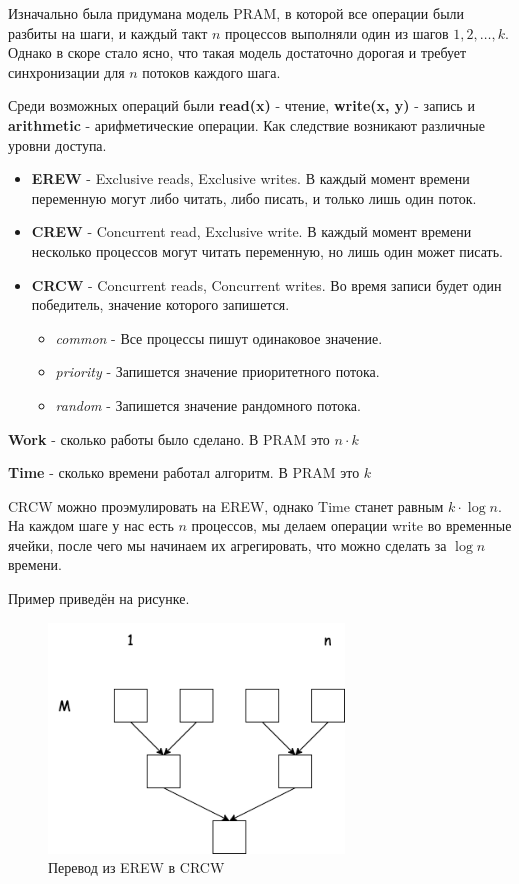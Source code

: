 \documentclass[11pt]{article}
\begin{document}
    Изначально была придумана модель PRAM, в которой все операции были разбиты на шаги,
    и каждый такт $n$ процессов выполняли один из шагов $1, 2, \dots, k$.
    Однако в скоре стало ясно, что такая модель достаточно дорогая и требует синхронизации для $n$ потоков каждого шага.

    Среди возможных операций были \textbf{read(x)} - чтение, \textbf{write(x, y)} - запись и \textbf{arithmetic} - арифметические операции.
    Как следствие возникают различные уровни доступа.
    \begin{itemize}
        \item \textbf{EREW} - Exclusive reads, Exclusive writes.
        В каждый момент времени переменную могут либо читать, либо писать, и только лишь один поток.
        \item \textbf{CREW} - Concurrent read, Exclusive write.
        В каждый момент времени несколько процессов могут читать переменную, но лишь один может писать.
        \item \textbf{CRCW} - Concurrent reads, Concurrent writes.
        Во время записи будет один победитель, значение которого запишется.
        \begin{itemize}
            \item \textit{common} - Все процессы пишут одинаковое значение.
            \item \textit{priority} - Запишется значение приоритетного потока.
            \item \textit{random} - Запишется значение рандомного потока.
        \end{itemize}
    \end{itemize}

    \textbf{Work} - сколько работы было сделано.
    В PRAM это $n \cdot k$

    \textbf{Time} - сколько времени работал алгоритм.
    В PRAM это $k$

    CRCW можно проэмулировать на EREW, однако Time станет равным $k \cdot \log{n}$.
    На каждом шаге у нас есть $n$ процессов, мы делаем операции write во временные ячейки,
    после чего мы начинаем их агрегировать, что можно сделать за $\log{n}$ времени.

    Пример приведён на рисунке.

    \begin{figure}[h!]
        \centering
        \includegraphics*[width=0.7\textwidth]{Pictures/PRAM/CRCW from EREW}
        \caption{Перевод из EREW в CRCW}
        \label{fig:erew_to_crcw}
    \end{figure}
\end{document}
